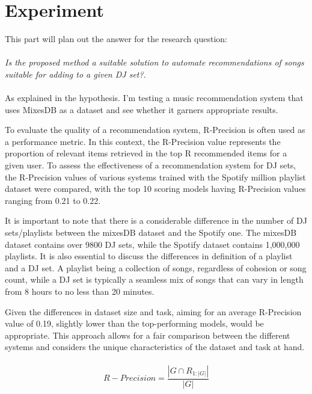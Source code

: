 
\graphicspath{{Chapter5/}}


\chapter{Experiment}


This part will plan out the answer for the research question: 
\\
\\
\textit{Is the proposed method a suitable solution to automate recommendations of songs suitable for adding to a given DJ set?}.
\\
\\
As explained in the hypothesis. I'm testing a music recommendation system that uses MixesDB as a dataset and see whether it garners appropriate results.

To evaluate the quality of a recommendation system, R-Precision is often used as a performance metric. In this context, the R-Precision value represents the proportion of relevant items retrieved in the top R recommended items for a given user. To assess the effectiveness of a recommendation system for DJ sets, the R-Precision values of various systems trained with the Spotify million playlist dataset were compared, with the top 10 scoring models having R-Precision values ranging from 0.21 to 0.22.

It is important to note that there is a considerable difference in the number of DJ sets/playlists between the mixesDB dataset and the Spotify one. The mixesDB dataset contains over 9800 DJ sets, while the Spotify dataset contains 1,000,000 playlists. It is also essential to discuss the differences in definition of a playlist and a DJ set. A playlist being a collection of songs, regardless of cohesion or song count, while a DJ set is typically a seamless mix of songs that can vary in length from 8 hours to no less than 20 minutes.

Given the differences in dataset size and task, aiming for an average R-Precision value of 0.19, slightly lower than the top-performing models, would be appropriate. This approach allows for a fair comparison between the different systems and considers the unique characteristics of the dataset and task at hand.
\\
\\
\begin{equation}
	R-Precision = \frac{|G\cap R_{1:|G|}|}{|G|}
\end{equation}
\\
\\
